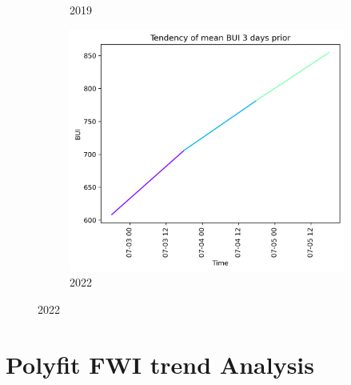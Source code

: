 \begin{figure}[h]
\begin{subfigure}{0.3\textwidth}
		\caption{2019}
		\label{fig:bui_prior_3_days_2019}
	\end{subfigure}
	\hfill
	\begin{subfigure}{0.3\textwidth}
		\centering
		\includegraphics[width=\textwidth]{graphs/3days/2022_3daysprior_tendency_graph_BUI.png}
		\caption{2022}
		\label{fig:bui_prior_3_days_2022}
	\end{subfigure}
	
	\label{fig:bui_values_3days_prior}
\end{figure}

\FloatBarrier

\section{Polyfit FWI trend Analysis}

